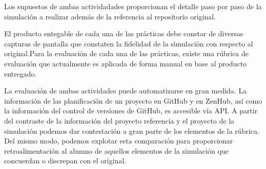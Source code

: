 Los supuestos de ambas actividadades proporcionan el  detalle paso por paso de la simulación a realizar además de la referencia al repositorio original. 


El producto entegable de cada una de las prácticas debe constar de diversas capturas de pantalla que constaten la fidelidad de la simulación con respecto al original.Para la evaluación de cada una de las prácticas, existe una rúbrica de evaluación que actualmente es aplicada de forma manual en base al producto entregado.


La evaluación de ambas actividades puede automatizarse en gran medida. La información de las planificación de un proyecto en GitHub y en ZenHub, así como la información  del control de versiones de GitHub, es accesible vía API. A partir del contraste de la información del proyecto referencia y el proyecto de la simulación podemos dar contestación a gran parte de los elementos de la rúbrica. Del mismo modo, podemos explotar esta comparación para proporcionar retroalimentación al alumno de aquellos elementos de la simulación que concuerdan o discrepan con el original.

